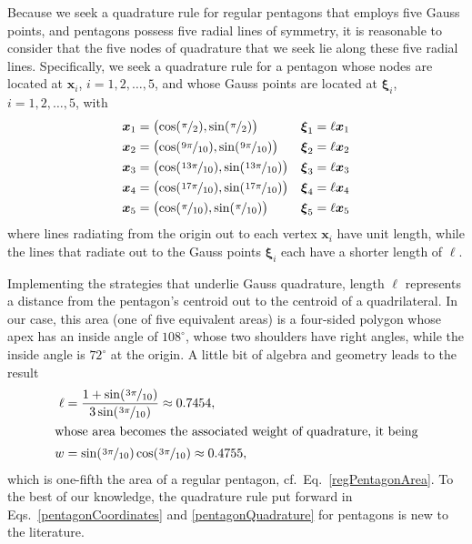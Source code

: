     Because we seek a quadrature rule for regular pentagons that employs five Gauss points, and pentagons possess five radial lines of symmetry, it is reasonable to consider that the five nodes of quadrature that we seek lie along these five radial lines.  Specifically, we seek a quadrature rule for a pentagon whose nodes are located at $\boldsymbol{x}_i$, $i=1,2,\ldots,5$, and whose Gauss points are located at $\boldsymbol{\xi}_i$, $i=1,2,\ldots,5$, with
    \begin{subequations}
        \label{pentagonCoordinates}
        \begin{align}
        \boldsymbol{x}_1 & = \bigl( \cos ( \textfrac{\pi}{2} ) ,
        \sin ( \textfrac{\pi}{2} ) \bigr) & \boldsymbol{\xi}_1 & = \ell \boldsymbol{x}_1 \\
        \boldsymbol{x}_2 & = \bigl( \cos ( \textfrac{9\pi}{10}) ,
        \sin ( \textfrac{9\pi}{10} ) \bigr) & \boldsymbol{\xi}_2 & = \ell \boldsymbol{x}_2 \\
        \boldsymbol{x}_3 & = \bigl( \cos ( \textfrac{13\pi}{10}) ,
        \sin ( \textfrac{13\pi}{10} ) \bigr) & \boldsymbol{\xi}_3 & = \ell \boldsymbol{x}_3 \\
        \boldsymbol{x}_4 & = \bigl( \cos ( \textfrac{17\pi}{10}) ,
        \sin ( \textfrac{17\pi}{10} ) \bigr) & \boldsymbol{\xi}_4 & = \ell \boldsymbol{x}_4 \\
        \boldsymbol{x}_5 & = \bigl( \cos ( \textfrac{\pi}{10}) ,
        \sin ( \textfrac{\pi}{10} ) \bigr) & \boldsymbol{\xi}_5 & = \ell \boldsymbol{x}_5
        \end{align}
    \end{subequations}
    where lines radiating from the origin out to each vertex $\boldsymbol{x}_i$ have unit length, while the lines that radiate out to the Gauss points $\boldsymbol{\xi}_i$ each have a shorter length of $\ell$.
    
    Implementing the strategies that underlie Gauss quadrature, length $\ell$ represents a distance from the pentagon's centroid out to the centroid of a quadrilateral.  In our case, this area (one of five equivalent areas) is a four-sided polygon whose apex has an inside angle of $108^{\circ}$, whose two shoulders have right angles, while the inside angle is $72^{\circ}$ at the origin.  A little bit of algebra and geometry leads to the result
    \begin{subequations}
        \label{pentagonQuadrature}
        \begin{align}
        \ell & = \frac{1 + \sin ( \textfrac{3\pi}{10} )}
        {3 \sin ( \textfrac{3\pi}{10} ) } \approx 0.7454, \\
        \intertext{whose area becomes the associated weight of quadrature, it being}
        w & = \sin ( \textfrac{3\pi}{10} ) \cos ( \textfrac{3\pi}{10} ) 
        \approx 0.4755,
        \end{align}
    \end{subequations}
    which is one-fifth the area of a regular pentagon, cf.\ Eq.~\ref{regPentagonArea}.  To the best of our knowledge, the quadrature rule put forward in Eqs.~\ref{pentagonCoordinates} and \ref{pentagonQuadrature} for pentagons is new to the literature. 
    
